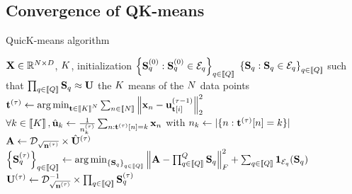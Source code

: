 \subsection{Convergence of QK-means}


\begin{algorithm}[t]
	\caption{QuicK-means algorithm}
	\label{algo:qmeans}
	\begin{algorithmic}[1]
		
		
		\REQUIRE ${\mathbf{X}} \in \mathbb{R}^{N \times D}$, $K$, initialization $\left \lbrace {\mathbf{S}}_q^{(0)} : {\mathbf{S}}_q^{(0)} \in \mathcal{E}_q\right \rbrace_{q\in\left \llbracket Q\right \rrbracket}$
		\ENSURE $\left \lbrace {\mathbf{S}}_q : {\mathbf{S}}_q \in \mathcal{E}_q\right \rbrace_{q\in\left \llbracket Q\right \rrbracket}$ such that $\prod_{q\in\left \llbracket Q\right \rrbracket}{\mathbf{S}}_q \approx {\mathbf{U}}$ the $K$ means of the $N$ data points
		\STATE ${\mathbf{t}}^{(\tau)} \leftarrow \operatorname*{arg\,min}_{{\mathbf{t}} \in \left \llbracket K\right \rrbracket^N} \sum_{n\in\left \llbracket N\right \rrbracket} {\left \|{\mathbf{x}}_n - {\mathbf{u}}^{(\tau -1)}_{{\mathbf{t}}[i]}\right \|_2^2}$\\
		\hfill {}
		\label{line:qmeans:assignment}
		\STATE $\forall k\in\left \llbracket K\right \rrbracket, \hat{{\mathbf{u}}}_k \leftarrow \frac{1}{n_k^{(\tau)}} \sum_{n: {\mathbf{t}}^{(\tau)}[n]= k} {{\mathbf{x}}_n}$
with $n_k \leftarrow |\{n: {\mathbf{t}}^{(\tau)}[n]=k\}|$
		\hfill {}
		\STATE ${\mathbf{A}} \leftarrow \mathcal{D}_{\sqrt{{\mathbf{n}}^{(\tau)}}} \times \hat{{\mathbf{U}}}^{(\tau)} $
		\hfill {}
		\STATE $\left \lbrace {\mathbf{S}}_q^{(\tau)}\right \rbrace_{q\in\left \llbracket Q\right \rrbracket} \leftarrow \operatorname*{arg\,min}_{\left \lbrace {\mathbf{S}}_q\right \rbrace_{q\in\left \llbracket Q\right \rrbracket}} \left \|{\mathbf{A}} - \prod_{q\in\left \llbracket Q\right \rrbracket}^{Q}{{\mathbf{S}}_q}\right \|_F^2 + \sum_{q\in\left \llbracket Q\right \rrbracket} \mathbf{1}_{\mathcal{E}_q}({\mathbf{S}}_q)$\\
		\hfill {}
		\STATE ${\mathbf{U}}^{(\tau)} \leftarrow \mathcal{D}_{\sqrt{{\mathbf{n}}^{(\tau)}}}^{-1} \times \prod_{q\in\left \llbracket Q\right \rrbracket}{{\mathbf{S}}_q^{(\tau)}}$
		\hfill {}
		\ENDFOR
	\end{algorithmic}
\end{algorithm}

